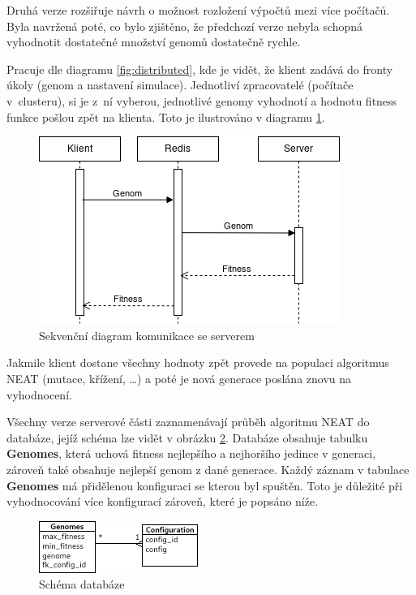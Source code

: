 Druhá verze rozšiřuje návrh o možnost rozložení výpočtů mezi více počítačů. Byla navržená poté, co bylo zjištěno, že předchozí verze nebyla schopná vyhodnotit dostatečné množství genomů dostatečně rychle.

Pracuje dle diagramu \ref{fig:distributed}, kde je vidět, že klient zadává do fronty úkoly (genom a nastavení simulace). Jednotliví zpracovatelé (počítače v~clusteru), si je z~ní vyberou, jednotlivé genomy vyhodnotí a hodnotu fitness funkce pošlou zpět na klienta. Toto je ilustrováno v diagramu \ref{fig:serverusecase}.

\begin{figure}[H]
	\centering
	\includegraphics[width=0.7\linewidth]{server_use_case}
	\caption{Sekvenční diagram komunikace se serverem}
	\label{fig:serverusecase}
\end{figure}

Jakmile klient dostane všechny hodnoty zpět provede na populaci algoritmus NEAT (mutace, křížení, \dots) a poté je nová generace poslána znovu na vyhodnocení.

Všechny verze serverové části zaznamenávají průběh algoritmu NEAT do databáze, jejíž schéma lze vidět v obrázku \ref{fig:database}. Databáze obsahuje tabulku \textbf{Genomes}, která uchová fitness nejlepšího a nejhoršího jedince v generaci, zároveň také obsahuje nejlepší genom z dané generace. Každý záznam v tabulace \textbf{Genomes} má přidělenou konfiguraci se kterou byl spuštěn. Toto je důležité při vyhodnocování více konfigurací zároveň, které je popsáno níže.

\begin{figure}[H]
	\centering
	\includegraphics[width=0.7\linewidth]{ERD}
	\caption{Schéma databáze}
	\label{fig:database}
\end{figure}

